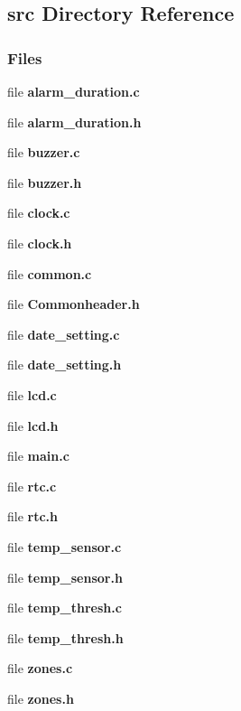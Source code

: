 \subsection{src Directory Reference}
\label{dir_d44fb21c5b63cbaf9caef2573d6f1983}
\subsubsection*{Files}
\begin{DoxyCompactItemize}
\item 
file \textbf{ alarm\+\_\+duration.\+c}
\item 
file \textbf{ alarm\+\_\+duration.\+h}
\item 
file \textbf{ buzzer.\+c}
\item 
file \textbf{ buzzer.\+h}
\item 
file \textbf{ clock.\+c}
\item 
file \textbf{ clock.\+h}
\item 
file \textbf{ common.\+c}
\item 
file \textbf{ Commonheader.\+h}
\item 
file \textbf{ date\+\_\+setting.\+c}
\item 
file \textbf{ date\+\_\+setting.\+h}
\item 
file \textbf{ lcd.\+c}
\item 
file \textbf{ lcd.\+h}
\item 
file \textbf{ main.\+c}
\item 
file \textbf{ rtc.\+c}
\item 
file \textbf{ rtc.\+h}
\item 
file \textbf{ temp\+\_\+sensor.\+c}
\item 
file \textbf{ temp\+\_\+sensor.\+h}
\item 
file \textbf{ temp\+\_\+thresh.\+c}
\item 
file \textbf{ temp\+\_\+thresh.\+h}
\item 
file \textbf{ zones.\+c}
\item 
file \textbf{ zones.\+h}
\end{DoxyCompactItemize}
